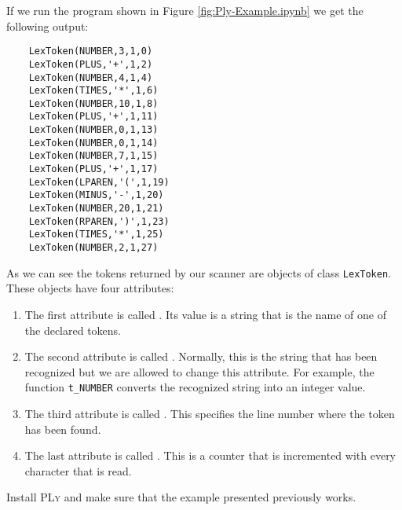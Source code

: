 \noindent
If we run the program shown in Figure \ref{fig:Ply-Example.ipynb} we get the following output:
\begin{verbatim}
    LexToken(NUMBER,3,1,0)
    LexToken(PLUS,'+',1,2)
    LexToken(NUMBER,4,1,4)
    LexToken(TIMES,'*',1,6)
    LexToken(NUMBER,10,1,8)
    LexToken(PLUS,'+',1,11)
    LexToken(NUMBER,0,1,13)
    LexToken(NUMBER,0,1,14)
    LexToken(NUMBER,7,1,15)
    LexToken(PLUS,'+',1,17)
    LexToken(LPAREN,'(',1,19)
    LexToken(MINUS,'-',1,20)
    LexToken(NUMBER,20,1,21)
    LexToken(RPAREN,')',1,23)
    LexToken(TIMES,'*',1,25)
    LexToken(NUMBER,2,1,27)
\end{verbatim}
As we can see the tokens returned by our scanner are objects of class \texttt{LexToken}.  These objects have
four attributes:
\begin{enumerate}
\item The first attribute is called .  Its value is a string that is the name of
      one of the declared tokens.
\item The second attribute is called .  Normally, this is the string that has been 
      recognized but we are allowed to change this attribute.  For example, the function \texttt{t\_NUMBER}
      converts the recognized string into an integer value.
\item The third attribute is called .  This specifies the line number where the token has been found.
\item The last attribute is called .  This is a counter that is incremented with every
      character that is read.
\end{enumerate}

\homeworkEng
Install \textsc{PLy} and make sure that the example presented previously works.  

